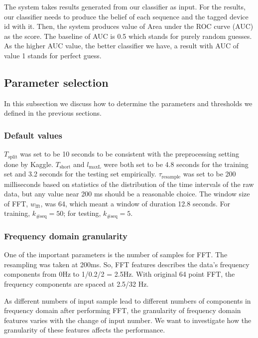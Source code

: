 \documentclass{article} %
\begin{document}
The system takes results generated from our classifier as input. For the results, our classifier needs to produce the belief of each sequence and the tagged device id with it. Then, the system produces value of Area under the ROC curve (AUC) as the score. The baseline of AUC is 0.5 which stands for purely random guesses. As the higher AUC value, the better classifier we have, a result with AUC of value 1 stands for perfect guess. 

\subsection{Parameter selection}
In this subsection we discuss how to determine the parameters and thresholds we defined in the previous sections.


\subsubsection{Default values}
$T_\mathrm{split}$ was set to be 10 seconds to be consistent with the preprocessing setting done by Kaggle.  $T_\mathrm{short}$ and $l_\mathrm{maxL}$ were both set to be 4.8 seconds for the training set and 3.2 seconds for the testing set empirically. $\tau_\mathrm{resample}$ was set to be 200 milliseconds based on statistics of the distribution of the time intervals of the raw data, but any value near 200 ms should be a reasonable choice. The window size of FFT, $w_\mathrm{fft}$, was 64, which meant a window of duration 12.8 seconds. For training, $k_\mathrm{\#seq}=50$; for testing, $k_\mathrm{\#seq}=5$.

\subsubsection{Frequency domain granularity}
One of the important parameters is the number of samples for FFT. The resampling was taken at 200ms. So, FFT features describes the data’s frequency components from 0Hz to 1/0.2/2 = 2.5Hz. With original 64 point FFT, the frequency components are spaced at 2.5/32 Hz. 

As different numbers of input sample lead to different numbers of components in frequency domain after performing FFT, the granularity of frequency domain features varies with the change of input number. We want to investigate how the granularity of these features affects the performance.
\end{document}
